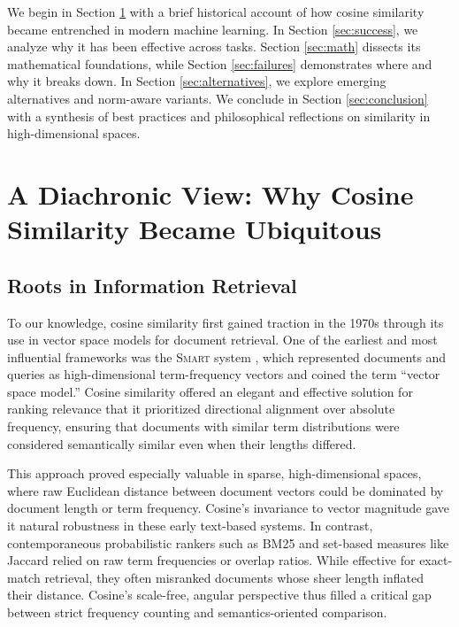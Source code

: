 \documentclass[11pt]{article}
\begin{document}
We begin in Section \ref{sec:history} with a brief historical account of how cosine similarity became entrenched in modern machine learning. In Section \ref{sec:success}, we analyze why it has been effective across tasks. Section \ref{sec:math} dissects its mathematical foundations, while Section \ref{sec:failures} demonstrates where and why it breaks down. In Section \ref{sec:alternatives}, we explore emerging alternatives and norm-aware variants. We conclude in Section \ref{sec:conclusion} with a synthesis of best practices and philosophical reflections on similarity in high-dimensional spaces.


\section{A Diachronic View: Why Cosine Similarity Became Ubiquitous}\label{sec:history}

\subsection{Roots in Information Retrieval}

To our knowledge, cosine similarity first gained traction in the 1970s through its use in vector space models for document retrieval. One of the earliest and most influential frameworks was the \textsc{Smart} system \citep{salton_1975_VectorSpaceModel}, which represented documents and queries as high-dimensional term-frequency vectors and coined the term ``vector space model.'' Cosine similarity offered an elegant and effective solution for ranking relevance that it prioritized directional alignment over absolute frequency, ensuring that documents with similar term distributions were considered semantically similar even when their lengths differed.

This approach proved especially valuable in sparse, high-dimensional spaces, where raw Euclidean distance between document vectors could be dominated by document length or term frequency. Cosine’s invariance to vector magnitude gave it natural robustness in these early text-based systems. In contrast, contemporaneous probabilistic rankers such as BM25 and set-based measures like Jaccard relied on raw term frequencies or overlap ratios. While effective for exact-match retrieval, they often misranked documents whose sheer length inflated their distance. Cosine's scale-free, angular perspective thus filled a critical gap between strict frequency counting and semantics-oriented comparison.
\end{document}
